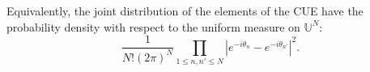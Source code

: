 \documentclass[twoside,11pt]{book}
\newtheorem{theorem}{Theorem}
\DeclareMathOperator{\Tr}{Tr}
\begin{document}
Equivalently, the joint distribution of the elements of the CUE have the probability density with respect to the uniform measure on $\mathbb{U}^{N}$:
\begin{equation}\label{eq:haar_eigenvalues_density}
 \frac{1}{N!(2\pi)^{N}} \prod\limits_{1 \leq n,n' \leq N} |e^{-i \theta_{n}} - e^{-i \theta_{n'}}|^{2}.
\end{equation}








\end{document}
